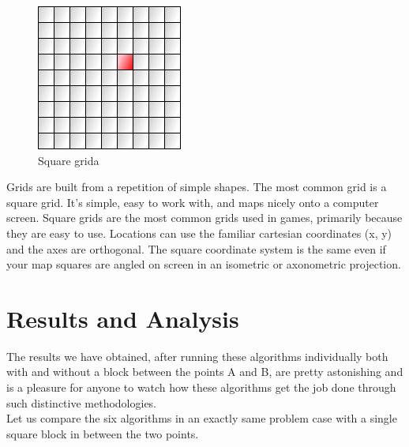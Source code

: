 \documentclass[a4paper]{article}
\begin{document}
\begin{figure}[h!]
  \centering
    \includegraphics[scale=.6]{images/square-grid.png}
  \caption{Square grida}
\end{figure}

\noindent Grids are built from a repetition of simple shapes. The most common grid is a square grid. It’s simple, easy to work with, and maps nicely onto a computer screen. Square grids are the most common grids used in games, primarily because they are easy to use. Locations can use the familiar cartesian coordinates (x, y) and the axes are orthogonal. The square coordinate system is the same even if your map squares are angled on screen in an isometric or axonometric projection.


\section{Results and Analysis}

The results we have obtained, after running these algorithms individually both with and without a block between the points A and B, are pretty astonishing and is a pleasure for anyone to watch how these algorithms get the job done through such distinctive methodologies.\\

\noindent Let us compare the six algorithms in an exactly same problem case with a single square block in between the two points.
\end{document}
